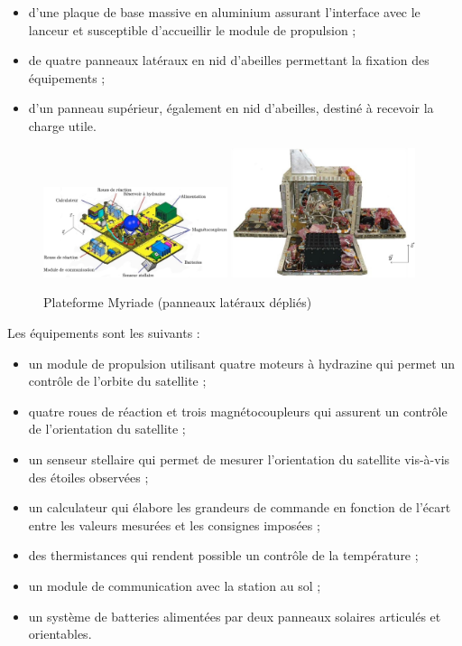 \begin{itemize}
\item d'une plaque de base massive en aluminium assurant l'interface avec le
  lanceur et susceptible d'accueillir le module de propulsion ;
\item de quatre panneaux latéraux en nid d'abeilles permettant la fixation
  des équipements ;
\item d'un panneau supérieur, également en nid d'abeilles, destiné à
  recevoir la charge utile.
\end{itemize}

\begin{figure}[!htb]
\begin{center}
\includegraphics[width=0.48\textwidth]{images/images2.jpg}
\includegraphics[width=0.48\textwidth]{images/images3.jpg}
\caption{Plateforme Myriade (panneaux latéraux dépliés) \label{fig2}}
\end{center}
\end{figure}

Les équipements sont les suivants :
\begin{itemize}
\item un module de propulsion utilisant quatre moteurs à hydrazine qui
  permet un contrôle de l'orbite du satellite ;
\item quatre roues de réaction et trois magnétocoupleurs qui assurent un
  contrôle de l'orientation du satellite ;
\item un senseur stellaire qui permet de mesurer l'orientation du satellite
  vis-à-vis des étoiles observées ;
\item un calculateur qui élabore les grandeurs de commande en fonction de
  l'écart entre les valeurs mesurées et les consignes imposées ;
\item des thermistances qui rendent possible un contrôle de la température ;
\item un module de communication avec la station au sol ;
\item un système de batteries alimentées par deux panneaux solaires
  articulés et orientables.
\end{itemize}

